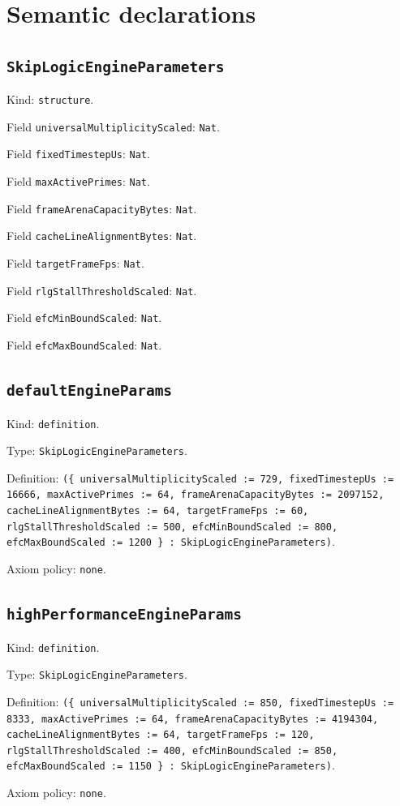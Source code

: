 \documentclass[11pt]{article}
\begin{document}
\section*{Semantic declarations}
\subsection*{\texttt{SkipLogicEngineParameters}}
\noindent Kind: \texttt{structure}.\par
\noindent Field \texttt{universalMultiplicityScaled}: \texttt{Nat}.\par
\noindent Field \texttt{fixedTimestepUs}: \texttt{Nat}.\par
\noindent Field \texttt{maxActivePrimes}: \texttt{Nat}.\par
\noindent Field \texttt{frameArenaCapacityBytes}: \texttt{Nat}.\par
\noindent Field \texttt{cacheLineAlignmentBytes}: \texttt{Nat}.\par
\noindent Field \texttt{targetFrameFps}: \texttt{Nat}.\par
\noindent Field \texttt{rlgStallThresholdScaled}: \texttt{Nat}.\par
\noindent Field \texttt{efcMinBoundScaled}: \texttt{Nat}.\par
\noindent Field \texttt{efcMaxBoundScaled}: \texttt{Nat}.\par
\subsection*{\texttt{defaultEngineParams}}
\noindent Kind: \texttt{definition}.\par
\noindent Type: \texttt{SkipLogicEngineParameters}.\par
\noindent Definition: \texttt{(\{ universalMultiplicityScaled := 729, fixedTimestepUs := 16666, maxActivePrimes := 64, frameArenaCapacityBytes := 2097152, cacheLineAlignmentBytes := 64, targetFrameFps := 60, rlgStallThresholdScaled := 500, efcMinBoundScaled := 800, efcMaxBoundScaled := 1200 \} : SkipLogicEngineParameters)}.\par
\noindent Axiom policy: \texttt{none}.\par
\subsection*{\texttt{highPerformanceEngineParams}}
\noindent Kind: \texttt{definition}.\par
\noindent Type: \texttt{SkipLogicEngineParameters}.\par
\noindent Definition: \texttt{(\{ universalMultiplicityScaled := 850, fixedTimestepUs := 8333, maxActivePrimes := 64, frameArenaCapacityBytes := 4194304, cacheLineAlignmentBytes := 64, targetFrameFps := 120, rlgStallThresholdScaled := 400, efcMinBoundScaled := 850, efcMaxBoundScaled := 1150 \} : SkipLogicEngineParameters)}.\par
\noindent Axiom policy: \texttt{none}.\par
\end{document}
